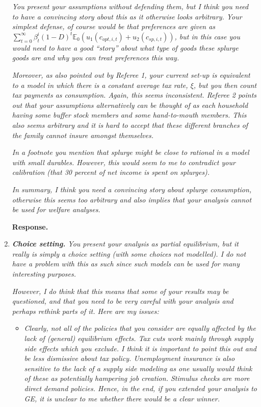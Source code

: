 \documentclass[12pt,letterpaper,english]{article}
\begin{document}
\begin{enumerate}
\textit{You present your assumptions without defending them, but I think you need to have a convincing story about this as it otherwise looks arbitrary. Your simplest defense, of course would be that preferences are given as $\sum_{t=0}^{\infty} \beta^i_t (1 - D)^{t} \mathbb{E}_0\left(u_1(c_{opt,i,t}) + u_2(c_{sp,i,t})\right)$, but in this case you would need to have a good ``story'' about what type of goods these splurge goods are and why you can treat preferences this way.}

\textit{Moreover, as also pointed out by Referee 1, your current set-up is equivalent to a model in which there is a constant average tax rate, $\xi$, but you then count tax	payments as consumption. Again, this seems inconsistent. Referee 2 points out that your assumptions alternatively can be thought of as each household having some buffer stock members and some hand-to-mouth members. This also seems arbitrary and it is hard to accept that these different branches of the family cannot insure amongst themselves.}

\textit{In a footnote you mention that splurge might be close to rational in a model with small durables. However, this would seem to me to contradict your calibration (that	30 percent of net income is spent on splurges).}

\textit{In summary, I think you need a convincing story about splurge consumption, otherwise this seems too arbitrary and also implies that your analysis cannot be used for	welfare analyses.}

\noindent \textbf{Response.} 

\item \textit{\textbf{Choice setting.} You present your analysis as partial equilibrium, but it really is simply a choice setting (with some choices not modelled). I do not have a problem	with this as such since such models can be used for many interesting purposes.}

\textit{However, I do think that this means that some of your results may be questioned,	and that you need to be very careful with your analysis and perhaps rethink parts of it. Here are my issues:}

\begin{itemize}
	\item \textit{Clearly, not all of the policies that you consider are equally affected by the lack of (general) equilibrium effects. Tax cuts work mainly through supply		side effects which you exclude. I think it is important to point this out and be less dismissive about tax policy. Unemployment insurance is also sensitive to the lack of a supply side modeling as one usually would think of these as potentially hampering job creation. Stimulus checks are more direct demand policies. Hence, in the end, if you extended your analysis to GE, it is unclear to me whether there would be a clear winner.}
	

\end{itemize}
\end{enumerate}
\end{document}
